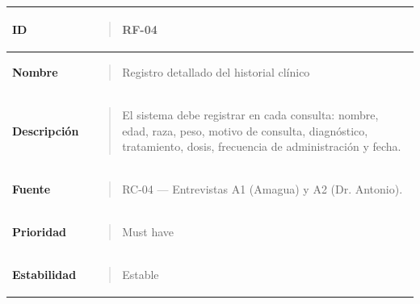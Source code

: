 \documentclass[
]{article}
\newcounter{none} %
\begin{document}
{\def\LTcaptype{none} %
\begin{longtable}[]{@{}
  >{\raggedright\arraybackslash}p{}
  >{\raggedright\arraybackslash}p{}@{}}
\toprule\noalign{}
\begin{minipage}[b]{\linewidth}\raggedright
\textbf{ID}
\end{minipage} & \begin{minipage}[b]{\linewidth}\raggedright
\begin{quote}
RF-04
\end{quote}
\end{minipage} \\
\midrule\noalign{}
\endhead
\bottomrule\noalign{}
\endlastfoot
\textbf{Nombre} & \begin{minipage}[t]{\linewidth}\raggedright
\begin{quote}
Registro detallado del historial clínico
\end{quote}
\end{minipage} \\
\textbf{Descripción} & \begin{minipage}[t]{\linewidth}\raggedright
\begin{quote}
El sistema debe registrar en cada consulta: nombre, edad, raza, peso,
motivo de consulta, diagnóstico, tratamiento, dosis, frecuencia de
administración y fecha.
\end{quote}
\end{minipage} \\
\textbf{Fuente} & \begin{minipage}[t]{\linewidth}\raggedright
\begin{quote}
RC-04 --- Entrevistas A1 (Amagua) y A2 (Dr. Antonio).
\end{quote}
\end{minipage} \\
\textbf{Prioridad} & \begin{minipage}[t]{\linewidth}\raggedright
\begin{quote}
Must have
\end{quote}
\end{minipage} \\
\textbf{Estabilidad} & \begin{minipage}[t]{\linewidth}\raggedright
\begin{quote}
Estable
\end{quote}
\end{minipage} \\

\end{longtable}}
\end{document}

